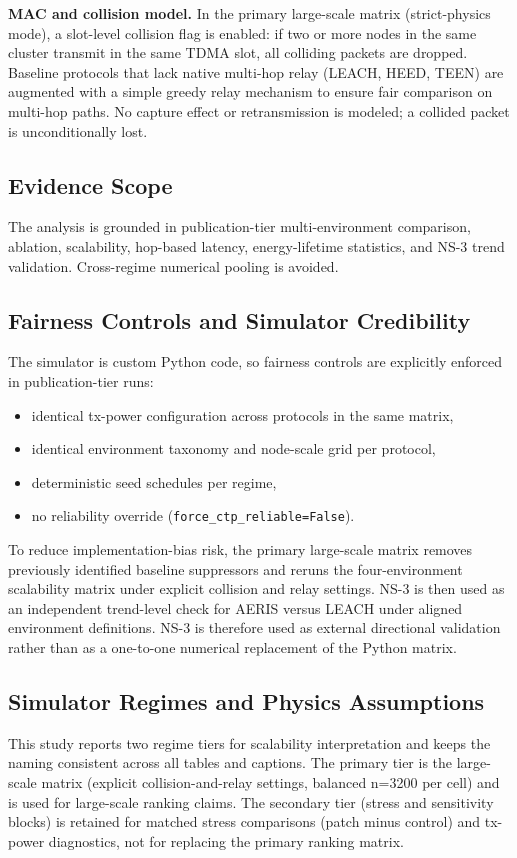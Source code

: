 ﻿\documentclass[sensors,article,submit,moreauthors,pdftex]{Definitions/mdpi}
\begin{document}
\noindent\textbf{MAC and collision model.}
In the primary large-scale matrix (strict-physics mode), a slot-level collision flag is enabled: if two or more nodes in the same cluster transmit in the same TDMA slot, all colliding packets are dropped.
Baseline protocols that lack native multi-hop relay (LEACH, HEED, TEEN) are augmented with a simple greedy relay mechanism to ensure fair comparison on multi-hop paths.
No capture effect or retransmission is modeled; a collided packet is unconditionally lost.

\subsection{Evidence Scope}
The analysis is grounded in publication-tier multi-environment comparison, ablation, scalability, hop-based latency, energy-lifetime statistics, and NS-3 trend validation. Cross-regime numerical pooling is avoided.

\subsection{Fairness Controls and Simulator Credibility}
The simulator is custom Python code, so fairness controls are explicitly enforced in publication-tier runs:
\begin{itemize}
\item identical tx-power configuration across protocols in the same matrix,
\item identical environment taxonomy and node-scale grid per protocol,
\item deterministic seed schedules per regime,
\item no reliability override (\texttt{force\_ctp\_reliable=False}).
\end{itemize}

To reduce implementation-bias risk, the primary large-scale matrix removes previously identified baseline suppressors and reruns the four-environment scalability matrix under explicit collision and relay settings. NS-3 is then used as an independent trend-level check for AERIS versus LEACH under aligned environment definitions. NS-3 is therefore used as external directional validation rather than as a one-to-one numerical replacement of the Python matrix.

\subsection{Simulator Regimes and Physics Assumptions}
This study reports two regime tiers for scalability interpretation and keeps the naming consistent across all tables and captions. The primary tier is the large-scale matrix (explicit collision-and-relay settings, balanced n=3200 per cell) and is used for large-scale ranking claims. The secondary tier (stress and sensitivity blocks) is retained for matched stress comparisons (patch minus control) and tx-power diagnostics, not for replacing the primary ranking matrix.
\end{document}
